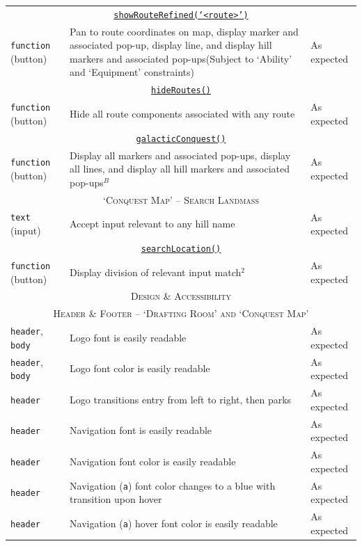 \documentclass[11pt, english]{article}
\begin{document}
\begin{center}
\begin{longtable}{p{3cm}p{8cm}p{2cm}}
		\multicolumn{3}{c}{\underline{\texttt{showRouteRefined(`<route>')}}}\\
		\texttt{function} (button) & Pan to route coordinates on map, display marker and associated pop-up, display line, and display hill markers and associated pop-ups\newline (Subject to `Ability' and `Equipment' constraints) & As expected\\
		\multicolumn{3}{c}{\underline{\texttt{hideRoutes()}}}\\
		\texttt{function} (button) & Hide all route components associated with any route & As expected\\
		\multicolumn{3}{c}{\underline{\texttt{galacticConquest()}}}\\
		\texttt{function} (button) & Display all markers and associated pop-ups, display all lines, and display all hill markers and associated pop-ups$^{B}$ & As expected\\
		\hline
		\multicolumn{3}{c}{\textsc{`Conquest Map' -- Search Landmass}}\\
		\hline
		\texttt{text} (input) & Accept input relevant to any hill name & As expected\\
		\multicolumn{3}{c}{\underline{\texttt{searchLocation()}}}\\
		\texttt{function} (button) & Display division of relevant input match$^{2}$ & As expected\\
		\hline
		\hline
		\multicolumn{3}{c}{\textsc{Design \& Accessibility}}\\
		\hline
		\hline
		\multicolumn{3}{c}{\textsc{Header \& Footer -- `Drafting Room' and `Conquest Map'}}\\
		\hline
		\texttt{header}, \texttt{body} & Logo font is easily readable & As expected\\
		\texttt{header}, \texttt{body} & Logo font color is easily readable & As expected\\
		\texttt{header} & Logo transitions entry from left to right, then parks & As expected\\
		\texttt{header} & Navigation font is easily readable & As expected\\
		\texttt{header} & Navigation font color is easily readable & As expected\\
		\texttt{header} & Navigation (\texttt{a}) font color changes to a blue with transition upon hover & As expected\\
		\texttt{header} & Navigation (\texttt{a}) hover font color is easily readable & As expected\\

\end{longtable}
\end{center}
\end{document}
